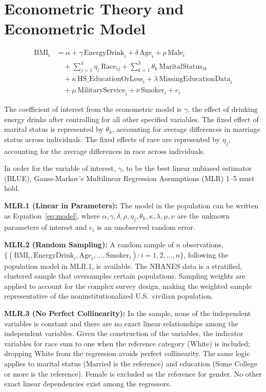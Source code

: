 \documentclass[12pt]{article}
\begin{document}
\section{Econometric Theory and Econometric Model}

\begin{equation}
\label{eq:model}
\begin{aligned}
\text{BMI}_i &= \alpha + \gamma \, \text{EnergyDrink}_i + \delta \, \text{Age}_i + \rho \, \text{Male}_i \\
&\quad + \sum_{j=1}^{4} \eta_j \, \text{Race}_{ij} + \sum_{k=1}^{3} \theta_k \, \text{MaritalStatus}_{ik} \\
&\quad + \kappa \, \text{HS\_EducationOrLess}_i + \lambda \, \text{MissingEducationData}_i \\
&\quad + \mu \, \text{MilitaryService}_i + \nu \, \text{Smoker}_i + e_i
\end{aligned}
\end{equation}

The coefficient of interest from the econometric model is $\gamma$, the effect of drinking energy drinks after controlling for all other specified variables. The fixed effect of marital status is represented by $\theta_k$, accounting for average differences in marriage status across individuals. The fixed effects of race are represented by $\eta_j$, accounting for the average differences in race across individuals.

In order for the variable of interest, $\gamma$, to be the best linear unbiased estimator (BLUE), Gauss-Markov's Multilinear Regression Assumptions (MLR) 1--5 must hold.

\textbf{MLR.1 (Linear in Parameters):} The model in the population can be written as Equation~\ref{eq:model}, where $\alpha, \gamma, \delta, \rho, \eta_j, \theta_k, \kappa, \lambda, \mu, \nu$ are the unknown parameters of interest and $e_i$ is an unobserved random error.

\textbf{MLR.2 (Random Sampling):} A random sample of $n$ observations, $\{(\text{BMI}_i, \text{EnergyDrink}_i, \text{Age}_i, \ldots, \text{Smoker}_i): i = 1, 2, \ldots, n\}$, following the population model in MLR.1, is available. The NHANES data is a stratified, clustered sample that oversamples certain populations. Sampling weights are applied to account for the complex survey design, making the weighted sample representative of the noninstitutionalized U.S.\ civilian population.

\textbf{MLR.3 (No Perfect Collinearity):} In the sample, none of the independent variables is constant and there are no exact linear relationships among the independent variables. Given the construction of the variables, the indicator variables for race sum to one when the reference category (White) is included; dropping White from the regression avoids perfect collinearity. The same logic applies to marital status (Married is the reference) and education (Some College or more is the reference). Female is excluded as the reference for gender. No other exact linear dependencies exist among the regressors.
\end{document}

